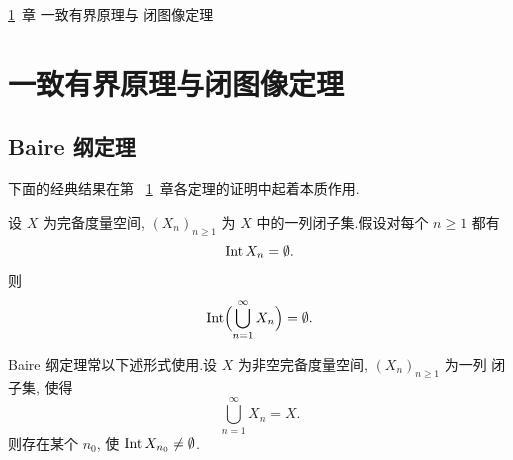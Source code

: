 \ref{chap:2}~章 一致有界原理与
闭图像定理

\chapter{一致有界原理与闭图像定理}
\label{chap:2}

\section{Baire 纲定理}
\label{sec:2.1}

下面的经典结果在第~
\ref{chap:2}~章各定理的证明中起着本质作用.

\begin{keytheorem}[Baire]
\label{thm:2.1}
设 $X$ 为完备度量空间, $(X_n)_{n\ge1}$ 为 $X$ 中的一列闭子集.假设对每个 $n\ge1$
都有
\begin{equation*}
\operatorname{Int} X_n=\emptyset.
\end{equation*}
则
\begin{equation*}
\operatorname{Int}\Bigl(\bigcup_{n=1}^\infty X_n\Bigr)=\emptyset.
\end{equation*}
\end{keytheorem}

\begin{remark}
\label{rem:2.1}
Baire 纲定理常以下述形式使用.设 $X$ 为非空完备度量空间, $(X_n)_{n\ge1}$ 为一列
闭子集, 使得
\begin{equation*}
\bigcup_{n=1}^\infty X_n=X.
\end{equation*}
则存在某个 $n_0$, 使 $\operatorname{Int} X_{n_0}\ne\emptyset$.
\end{remark}

